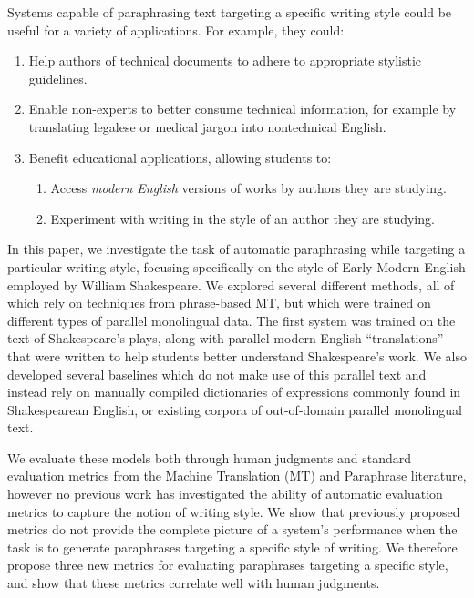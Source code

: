 \documentclass[10pt,a5paper,twoside]{article}
\begin{document}

Systems capable of paraphrasing text targeting a specific writing style could be useful for a variety of applications.  For example, they could:
\begin{enumerate}
  \item Help authors of technical documents to adhere to appropriate stylistic guidelines.  
  \item Enable non-experts to better consume technical information, for example by translating legalese or medical jargon into nontechnical English.  
  \item Benefit educational applications, allowing students to:
    \begin{enumerate}
    \item Access \emph{modern English} versions of works by authors they are studying.
    \item Experiment with writing in the style of an author they are studying.
    \end{enumerate}
\end{enumerate}

In this paper, we investigate the task of automatic paraphrasing while targeting a particular writing style, focusing specifically on the style of Early Modern English employed by William Shakespeare.
We explored several different methods, all of which rely on techniques from phrase-based MT, but which were trained on different types of parallel monolingual data.  The first system was trained on the text of Shakespeare’s plays, along with parallel modern English “translations” that were written to help students better understand Shakespeare's work.  
We also developed several baselines which do not make use of this parallel text and instead rely on manually compiled dictionaries of expressions commonly found in Shakespearean English, or existing
corpora of out-of-domain parallel monolingual text.

We evaluate these models both through human judgments and standard evaluation metrics from the Machine Translation (MT) and Paraphrase literature, however no previous work has investigated the ability of automatic
evaluation metrics to capture the notion of writing style.  
We show that previously proposed metrics do not provide the complete picture of a system's performance when the task is to generate paraphrases
targeting a specific style of writing.  We therefore propose three new metrics for evaluating paraphrases targeting a specific style, and 
show that these metrics correlate well with human judgments.
\end{document}
